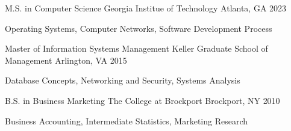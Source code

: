 

\begin{cventries}

  \cventry
    {M.S. in Computer Science} %
    {Georgia Institue of Technology} %
    {Atlanta, GA} %
    {2023} %
    {
      \begin{cvitems} %
        \item {Operating Systems, Computer Networks, Software Development Process}
      \end{cvitems}
    }

  \cventry
    {Master of Information Systems Management} %
    {Keller Graduate School of Management} %
    {Arlington, VA} %
    {2015} %
    {
      \begin{cvitems} %
        \item {Database Concepts, Networking and Security, Systems Analysis}
      \end{cvitems}
    }
  \cventry
    {B.S. in Business Marketing} %
    {The College at Brockport} %
    {Brockport, NY} %
    {2010} %
    {
      \begin{cvitems} %
        \item {Business Accounting, Intermediate Statistics, Marketing Research}
      \end{cvitems}
    }
\end{cventries}
